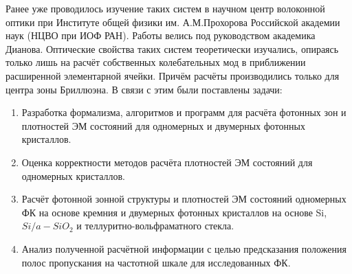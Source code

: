 
Ранее уже проводилось изучение таких систем в научном центр волоконной оптики при Институте общей физики
им. А.М.Прохорова Российской академии наук (НЦВО при ИОФ РАН). Работы велись под руководством академика Дианова.
Оптические свойства таких систем теоретически изучались, опираясь только лишь на расчёт собственных колебательных
мод в приближении расширенной элементарной ячейки. Причём расчёты производились только для центра зоны Бриллюэна.
В связи с этим были поставлены задачи:
\begin{enumerate}
  \item Разработка формализма, алгоритмов и программ для расчёта фотонных зон и плотностей ЭМ состояний
  для одномерных и двумерных фотонных кристаллов.
  \item Оценка корректности методов расчёта плотностей ЭМ состояний для одномерных кристаллов.
  \item Расчёт фотонной зонной структуры и плотностей ЭМ состояний одномерных ФК на основе кремния и двумерных фотонных кристаллов на основе Si, $Si/a-SiO_2$ и теллуритно-вольфраматного стекла.
  \item Анализ полученной расчётной информации с целью предсказания положения полос пропускания на частотной шкале для исследованных ФК.
\end{enumerate}
